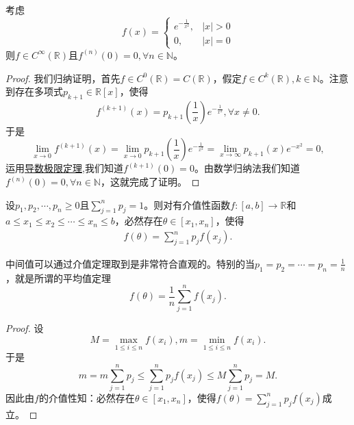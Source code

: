 \documentclass[../../main.tex]{subfiles}%
\begin{document}
\begin{example}[\,\,经典光滑函数]\label{example:经典光滑函数}
考虑
\[
f(x)=
\begin{cases}
e^{-\frac{1}{x^2}}, &|x|>0 \\
0, &|x| = 0
\end{cases}
\]
则\(f\in C^{\infty}(\mathbb{R})\)且\(f^{(n)}(0)=0,\forall n\in\mathbb{N}\)。
\end{example}
\begin{proof}
我们归纳证明，首先\(f\in C^{0}(\mathbb{R}) = C(\mathbb{R})\)，假定\(f\in C^{k}(\mathbb{R}),k\in\mathbb{N}\)。注意到存在多项式\(p_{k + 1}\in\mathbb{R}[x]\)，使得
\[
f^{(k + 1)}(x)=p_{k + 1}\left(\frac{1}{x}\right)e^{-\frac{1}{x^2}},\forall x\neq0.
\]
于是
\[
\lim_{x\rightarrow0}f^{(k + 1)}(x)=\lim_{x\rightarrow0}p_{k + 1}\left(\frac{1}{x}\right)e^{-\frac{1}{x^2}}=\lim_{x\rightarrow\infty}p_{k + 1}(x)e^{-x^2}=0,
\]
运用\hyperref[theorem:导数极限定理]{导数极限定理},我们知道\(f^{(k + 1)}(0)=0\)。由数学归纳法我们知道\(f^{(n)}(0)=0,\forall n\in\mathbb{N}\)，这就完成了证明。
\end{proof}

\begin{theorem}[连续函数中间值定理]\label{theorem:连续函数中间值定理}
设\(p_1,p_2,\cdots,p_n\geqslant0\)且\(\sum_{j = 1}^{n}p_j = 1\)。则对有介值性函数\(f:[a,b]\to\mathbb{R}\)和\(a\leqslant x_1\leqslant x_2\leqslant\cdots\leqslant x_n\leqslant b\)，必然存在\(\theta\in[x_1,x_n]\)，使得
\begin{align*}
f(\theta)=\sum_{j = 1}^{n}p_jf(x_j).
\end{align*}
\end{theorem}
\begin{note}
中间值可以通过介值定理取到是非常符合直观的。特别的当\(p_1 = p_2=\cdots=p_n=\frac{1}{n}\)，就是所谓的平均值定理
\[
f(\theta)=\frac{1}{n}\sum_{j = 1}^{n}f(x_j).
\]
\end{note}
\begin{proof}
设
\[
M=\max_{1\leqslant i\leqslant n}f(x_i),m=\min_{1\leqslant i\leqslant n}f(x_i).
\]
于是
\[
m = m\sum_{j = 1}^{n}p_j\leqslant\sum_{j = 1}^{n}p_jf(x_j)\leqslant M\sum_{j = 1}^{n}p_j = M.
\]
因此由\(f\)的介值性知：必然存在\(\theta\in[x_1,x_n]\)，使得$f(\theta)=\sum_{j = 1}^{n}p_jf(x_j)$成立。
\end{proof}
\end{document}
